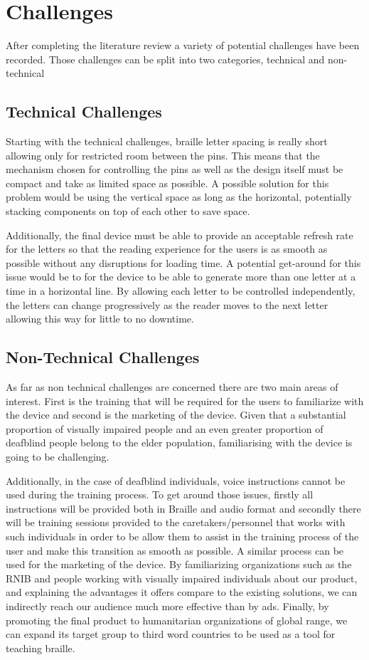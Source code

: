 \section{Challenges}
After completing the literature review a variety of potential challenges have been recorded.
Those challenges can be split into two categories, technical and non-technical 

\subsection{Technical Challenges}
Starting with the technical challenges, braille letter spacing is really short allowing only for restricted room between the pins.
This means that the mechanism chosen for controlling the pins as well as the design itself must be compact and take as limited space as possible.
A possible solution for this problem would be using the vertical space as long as the horizontal, potentially stacking components on top of each other to save space.

Additionally, the final device must be able to provide an acceptable refresh rate for the letters so that the reading experience for the users is as smooth as possible without any disruptions for loading time.
A potential get-around for this issue would be to for the device to be able to generate more than one letter at a time in a horizontal line.
By allowing each letter to be controlled independently, the letters can change progressively as the reader moves to the next letter allowing this way for little to no downtime.
 

\subsection{Non-Technical Challenges}
As far as non technical challenges are concerned there are two main areas of interest.
First is the training that will be required for the users to familiarize with the device and second is the marketing of the device.
Given that a substantial proportion of visually impaired people and an even greater proportion of deafblind people belong to the elder population, familiarising with the device is going to be challenging.

Additionally, in the case of deafblind individuals, voice instructions cannot be used during the training process.
To get around those issues, firstly all instructions will be provided both in Braille and audio format and secondly there will be training sessions provided to the caretakers/personnel that works with such individuals in order to be allow them to assist in the training process of the user and make this transition as smooth as possible.
A similar process can be used for the marketing of the device.
By familiarizing organizations such as the RNIB and people working with visually impaired individuals about our product, and explaining the advantages it offers compare to the existing solutions, we can indirectly reach our audience much more effective than by ads. Finally, by promoting the final product to humanitarian organizations of global range, we can expand its target group to third word countries to be used as a tool for teaching braille. 
 